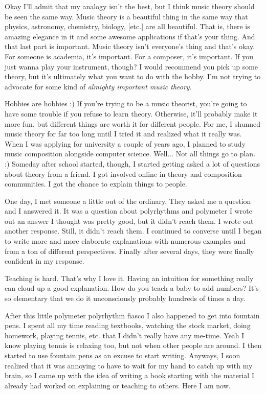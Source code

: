 \documentclass[../OpenAppliedMusicTheory.tex]{subfiles}
\begin{document}
    Okay I'll admit that my analogy isn't the best, but I think music theory should be seen the same way. Music theory is a beautiful thing in the same way that physics, astronomy, chemistry, biology, [etc.] are all beautiful. That is, there is amazing elegance in it and some awesome applications if that's your thing. And that last part is important. Music theory isn't everyone's thing and that's okay. For someone is academia, it's important. For a composer, it's important. If you just wanna play your instrument, though? I would recommend you pick up some theory, but it's ultimately what you want to do with the hobby. I'm not trying to advocate for some kind of \emph{almighty important music theory}.

    Hobbies are hobbies :) If you're trying to be a music theorist, you're going to have some trouble if you refuse to learn theory. Otherwise, it'll probably make it more fun, but different things are worth it for different people. For me, I shunned music theory for far too long until I tried it and realized what it really was. When I was applying for university a couple of years ago, I planned to study music composition alongside computer science. Well... Not all things go to plan. :) Someday after school started, though, I started getting asked a lot of questions about theory from a friend. I got involved online in theory and composition communities. I got the chance to explain things to people.

    One day, I met someone a little out of the ordinary. They asked me a question and I answered it. It was a question about polyrhythms and polymeter I wrote out an answer I thought was pretty good, but it didn't reach them. I wrote out another response. Still, it didn't reach them. I continued to converse until I began to write more and more elaborate explanations with numerous examples and from a ton of different perspectives. Finally after several days, they were finally confident in my response. 

    Teaching is hard. That's why I love it. Having an intuition for something really can cloud up a good explanation. How do you teach a baby to add numbers? It's so elementary that we do it unconsciously probably hundreds of times a day. 

    After this little polymeter polyrhythm fiasco I also happened to get into fountain pens. I spent all my time reading textbooks, watching the stock market, doing homework, playing tennis, etc. that I didn't really have any me-time. Yeah I know playing tennis is relaxing too, but not when other people are around. I then started to use fountain pens as an excuse to start writing. Anyways, I soon realized that it was annoying to have to wait for my hand to catch up with my brain, so I came up with the idea of writing a book starting with the material I already had worked on explaining or teaching to others. Here I am now.
\end{document}
